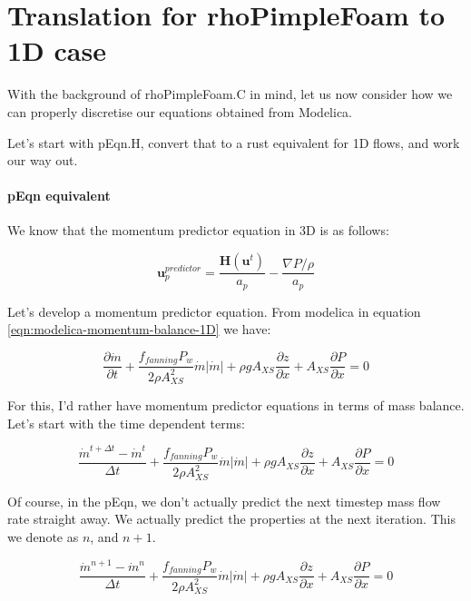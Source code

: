 \documentclass[masters]{ucbthesis}
\renewcommand{\_}{\kern-1.5pt\textunderscore\kern-1.5pt}
\begin{document}
\chapter{Translation for rhoPimpleFoam to 1D case}

With the background of rhoPimpleFoam.C in mind, let us now consider how 
we can properly discretise our equations obtained from Modelica.

Let's start with pEqn.H, convert that to a rust equivalent for 1D 
flows, and work our way out.
\subsubsection{pEqn equivalent}

We know that the momentum predictor equation in 3D is as follows:

\begin{equation*}
	\textbf{u}_p^{predictor} = \frac{\textbf{H}(\textbf{u}^t)}{a_p}
	- \frac{\nabla P/\rho}{a_p}
\end{equation*}

Let's develop a momentum predictor equation. From modelica in 
equation \ref{eqn:modelica-momentum-balance-1D} \citep{Casella2003} 
we have:

\begin{equation*} 
	\frac{\partial \dot{m}}{\partial t}
	+\frac{f_{fanning} P_w}{2 \rho A_{XS}^2} \dot{m} |\dot{m}|
	+ \rho g A_{XS} \frac{\partial z}{\partial x}
	+ A_{XS} \frac{\partial P}{\partial x} = 0
\end{equation*}

For this, I'd rather have momentum predictor equations in terms 
of mass balance. Let's start with the time dependent terms:

\begin{equation*} 
	\frac{\dot{m}^{t + \Delta t} - \dot{m}^t}{\Delta t}
	+\frac{f_{fanning} P_w}{2 \rho A_{XS}^2} \dot{m} |\dot{m}|
	+ \rho g A_{XS} \frac{\partial z}{\partial x}
	+ A_{XS} \frac{\partial P}{\partial x} = 0
\end{equation*}

Of course, in the pEqn, we don't actually predict the next timestep 
mass flow rate straight away. We actually predict the properties at the 
next iteration. This we denote as $n$, and $n+1$.


\begin{equation*} 
	\frac{\dot{m}^{n+1} - \dot{m}^n}{\Delta t}
	+\frac{f_{fanning} P_w}{2 \rho A_{XS}^2} \dot{m} |\dot{m}|
	+ \rho g A_{XS} \frac{\partial z}{\partial x}
	+ A_{XS} \frac{\partial P}{\partial x} = 0
\end{equation*}
\end{document}
